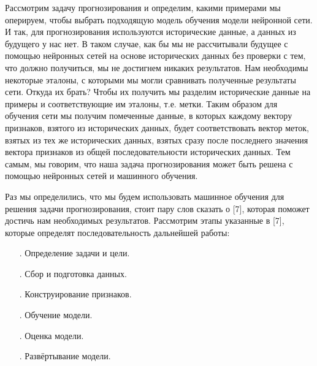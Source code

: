 {	\par \redline	Рассмотрим задачу прогнозирования и определим, какими примерами мы оперируем, чтобы выбрать подходящую модель обучения модели нейронной сети. И так, для прогнозирования используются исторические данные, а данных из будущего у нас нет. В таком случае, как бы мы не рассчитывали будущее с помощью нейронных сетей на основе исторических данных без проверки с тем, что должно получиться, мы не достигнем никаких результатов. Нам необходимы некоторые эталоны, с которыми мы могли сравнивать полученные результаты сети. Откуда их брать? Чтобы их получить мы разделим исторические данные на примеры и соответствующие им эталоны, т.е. метки. Таким образом для обучения сети мы получим помеченные данные, в которых каждому вектору признаков, взятого из исторических данных, будет соответствовать вектор меток, взятых из тех же исторических данных, взятых сразу после последнего значения вектора признаков из общей последовательности исторических данных. Тем самым, мы говорим, что наша задача прогнозирования может быть решена с помощью нейронных сетей и машинного обучения.
	
	\par \redline Раз мы определились, что мы будем использовать машинное обучения для решения задачи прогнозирования, стоит пару слов сказать о [7], которая поможет достичь нам необходимых результатов. Рассмотрим этапы указанные в [7], которые определят последовательность дальнейшей работы:
	
	
	\begin{itemize}[leftmargin=2.15cm, labelwidth=0.65cm, labelsep=0.0cm] 
		
		\item[\theitemcntr. ] Определение задачи и цели.
		\addtocounter{itemcntr}{1}
		
		\item[\theitemcntr. ] Сбор и подготовка данных.
		\addtocounter{itemcntr}{1}
		
		\item[\theitemcntr. ] Конструирование признаков.
		\addtocounter{itemcntr}{1}
		
		\item[\theitemcntr. ] Обучение модели.
		\addtocounter{itemcntr}{1}
		
		\item[\theitemcntr. ] Оценка модели.
		\addtocounter{itemcntr}{1}
		
		\item[\theitemcntr. ] Развёртывание модели.
		\addtocounter{itemcntr}{1}
		

\end{itemize}}
